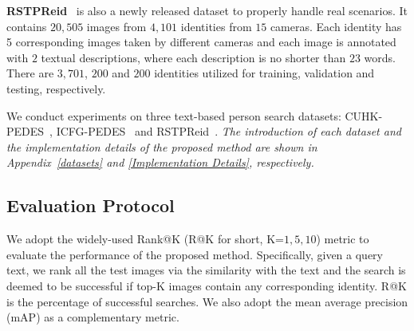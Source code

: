 \documentclass{article}
\begin{document}
\noindent\textbf{RSTPReid}~\cite{zhu2021dssl} is also a newly released dataset to properly handle real scenarios. It contains $20,505$ images from $4,101$ identities from $15$ cameras. Each identity has 5 corresponding images taken by different cameras and each image is annotated with $2$ textual descriptions, where each description is no shorter than $23$ words. There are $3,701$, $200$ and $200$ identities utilized for training, validation and testing, respectively.
\fi

We conduct experiments on three text-based person search datasets: CUHK-PEDES~\cite{li2017person}, ICFG-PEDES~\cite{ding2021semantically} and RSTPReid~\cite{zhu2021dssl}.
\emph{The introduction of each dataset and the implementation details of the proposed method are shown in Appendix~\ref{datasets} and \ref{Implementation Details}, respectively.}

\subsection{Evaluation Protocol}
We adopt the widely-used Rank@K (R@K for short, K=$1,5,10$) metric to evaluate the performance of the proposed method. 
Specifically, given a query text, we rank all the test images via the similarity with the text and the search is deemed to be successful if top-K images contain any corresponding identity. R@K is the percentage of successful searches. 
We also adopt the mean average precision (mAP) as a complementary metric.
\end{document}
